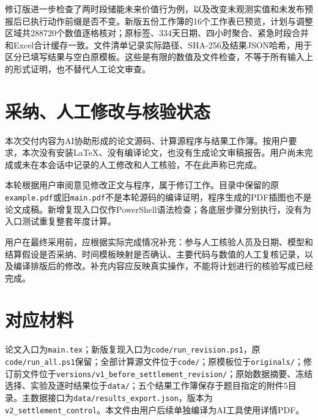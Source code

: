 \documentclass[UTF8,a4paper,11pt]{ctexart}
\begin{document}
修订版进一步检查了两时段储能未来价值行为例，以及改变未观测实值和未发布预报后已执行动作前缀是否不变。新版五份工作簿的16个工作表已预览，计划与调整区域共288720个数值逐格核对；原标签、334天日期、四小时聚合、紧急时段合并和Excel合计缓存一致。文件清单记录实际路径、SHA-256及结果JSON哈希，用于区分已填写结果与空白原模板。这些是有限的数值及文件检查，不等于所有输入上的形式证明，也不替代人工论文审查。

\section{采纳、人工修改与核验状态}
本次交付内容为AI协助形成的论文源码、计算源程序与结果工作簿。按用户要求，本次没有安装LaTeX、没有编译论文，也没有生成论文审稿报告。用户尚未完成或未在本会话中记录的人工修改和人工核验，不在此声称已完成。

本轮根据用户审阅意见修改正文与程序，属于修订工作。目录中保留的原\texttt{example.pdf}或旧\texttt{main.pdf}不是本轮源码的编译证明，程序生成的PDF插图也不是论文成稿。新增复现入口仅作PowerShell语法检查；各底层步骤分别执行，没有为入口测试重复整套年度计算。

用户在最终采用前，应根据实际完成情况补充：参与人工核验人员及日期、模型和结算假设是否采纳、时间模板映射是否确认、主要代码与数值的人工复核记录，以及编译排版后的修改。补充内容应反映真实操作，不能将计划进行的核验写成已经完成。

\section{对应材料}
论文入口为\texttt{main.tex}；新版复现入口为\texttt{code/run\_revision.ps1}，原\texttt{code/run\_all.ps1}保留；全部计算源文件位于\texttt{code/}；原模板位于\texttt{originals/}；修订前文件位于\texttt{versions/v1\_before\_settlement\_revision/}；原始数据摘要、冻结选择、实验及逐时结果位于\texttt{data/}；五个结果工作簿保存于题目指定的附件5目录。主数据接口为\texttt{data/results\_export.json}，版本为\texttt{v2\_settlement\_control}。本文件由用户后续单独编译为AI工具使用详情PDF。
\end{document}
